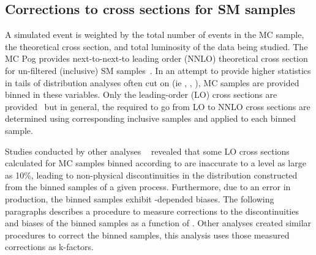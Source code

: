 \subsection{Corrections to cross sections for SM samples\label{sec:k-factors}}

A simulated event is weighted by the total number of events in the MC sample, 
the theoretical cross section, and total luminosity of the data being studied.
The MC Pog provides next-to-next-to leading order (NNLO) theoretical cross section
for un-filtered (inclusive) SM samples~\cite{twiki-xs}. In an attempt to 
provide higher statistics in tails of distribution analyses often cut on 
(ie \partonht, \nparton, \pthat), MC samples are provided binned in these
 variables. Only the leading-order (LO) cross sections are provided~\cite{prep} 
but in general, the \kfactors required to go from LO to NNLO cross sections
are determined using corresponding inclusive samples and applied to each binned sample. 

Studies conducted by other analyses ~\cite{RobXS} revealed that some LO cross
sections calculated for MC samples binned according to \partonht are
inaccurate to a level as large as 10\%, leading to non-physical discontinuities 
in the \partonht distribution constructed from the binned samples of a given process.
Furthermore, due to an error in production, the \wlnu \; \scalht binned samples exhibit 
\scalht-depended biases. The following paragraphs describes a procedure to measure 
corrections to the discontinuities and biases of the \wlnu \; \partonht binned samples 
as a function of \scalht. Other analyses created similar procedures to correct 
the \zmumu \; \partonht binned samples, this analysis uses those measured corrections 
as k-factors.  

